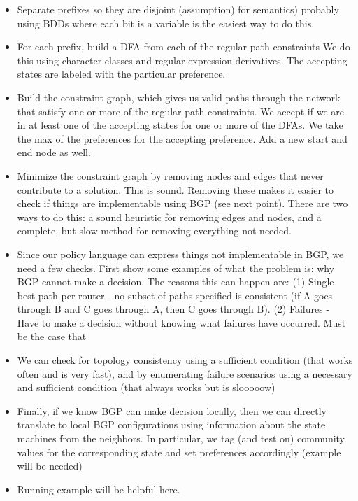 \documentclass{sigplanconf}
\begin{document}
\begin{itemize}
	\item Separate prefixes so they are disjoint (assumption) for semantics)
		  probably using BDDs where each bit is a variable is the easiest way to do this.
	\item For each prefix, build a DFA from each of the regular path constraints 
		  We do this using character classes and regular expression derivatives.
		  The accepting states are labeled with the particular preference.
	\item Build the constraint graph, which gives us valid paths through the network that satisfy one or 
		  more of the regular path constraints. We accept if we are in at least one of the accepting states 
		  for one or more of the DFAs. We take the max of the preferences for the accepting preference.
		  Add a new start and end node as well.
		  
	\item Minimize the constraint graph by removing nodes and edges that never contribute to a solution. 
		  This is sound. Removing these makes it easier to check if things are implementable using BGP (see next point).
		  There are two ways to do this: a sound heuristic for removing edges and nodes, and a complete, but slow method for 
		  removing everything not needed.
		  
	\item Since our policy language can express things not implementable in BGP, we need a few checks.
		  First show some examples of what the problem is: why BGP cannot make a decision. 
		  The reasons this can happen are: 
		  (1) Single best path per router - no subset of paths specified is consistent (if A goes through B and C goes through A, then C goes through B).
		  (2) Failures - Have to make a decision without knowing what failures have occurred. Must be the case that 
		                 

	\item We can check for topology consistency using a sufficient condition (that works often and is very fast), 
		  and by enumerating failure scenarios using a necessary and sufficient condition (that always works but is slooooow)
	
	\item Finally, if we know BGP can make decision locally, then we can directly translate to local BGP configurations using 
		  information about the state machines from the neighbors. In particular, we tag (and test on) community values for the
		  corresponding state and set preferences accordingly (example will be needed)
	\item Running example will be helpful here.	
\end{itemize}
\end{document}
